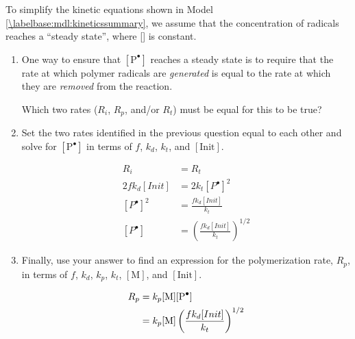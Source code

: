 \begin{activity}
\begin{ctqs}
\begin{enumerate}
		\end{enumerate}

	\question To simplify the kinetic equations shown in Model \ref{\labelbase:mdl:kineticssummary}, we assume that the concentration of radicals reaches a ``steady state'', where [] is constant.
	
		\begin{enumerate}
			\item One way to ensure that $[\text{P}^{\bullet}]$ reaches a steady state is to require that the rate at which polymer radicals are \emph{generated} is equal to the rate at which they are \emph{removed} from the reaction.
			
				Which two rates ($R_i$, $R_p$, and/or $R_t$) must be equal for this to be true?
				
				\begin{solution}[0.75in]
				\end{solution}
				
			\item Set the two rates identified in the previous question equal to each other and solve for $[\text{P}^{\bullet}]$ in terms of $f$, $k_d$, $k_t$, and $[\text{Init}]$.
			
				\begin{solution}[2in]
					\begin{align*}
						R_i &= R_t \\
						2fk_d[Init] &= 2k_t[P^\bullet]^2\\
						[P^\bullet]^2 &= \frac{fk_d[Init]}{k_t}\\
						[P^\bullet] &= \left(\frac{fk_d[Init]}{k_t}\right)^{1/2}
					\end{align*}
				\end{solution}
			
			\item Finally, use your answer to find an expression for the polymerization rate, $R_p$, in terms of $f$, $k_d$, $k_p$, $k_t$, $[\text{M}]$, and $[\text{Init}]$.
			
				\begin{solution}[1.5in]
					\begin{align*}
						R_p &= k_p\text{[M][\ce{P^.}]}\\
						&= k_p\text{[M]}\left(\frac{fk_d[Init]}{k_t}\right)^{1/2}
					\end{align*}
				\end{solution}
			
		\end{enumerate}
	

\end{ctqs}
\end{activity}
